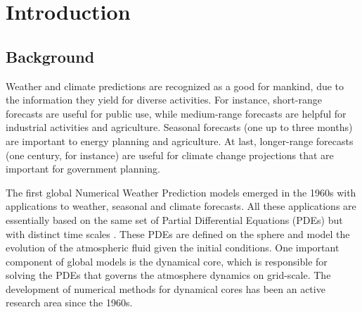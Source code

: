 

\chapter{Introduction}
\label{cap:introduction}

\enlargethispage{.5\baselineskip}

\section{Background}
Weather and climate predictions are recognized as a good for mankind,
due to the information they yield for diverse activities. 
For instance, short-range forecasts are useful for public use, while
medium-range forecasts are helpful for industrial activities and agriculture. 
Seasonal forecasts (one up to three months) are important to energy planning and agriculture.
At last, longer-range forecasts (one century, for instance) are useful for climate change 
projections that are important for government planning.

The first global Numerical Weather Prediction models emerged in the 1960s
with applications to weather, seasonal and climate forecasts. 
All these applications are essentially based on the same set of Partial Differential Equations
(PDEs) but with distinct time scales \citep{will:2007}. These PDEs are defined on the sphere
and model the evolution of the atmospheric fluid given the initial conditions.
One important component of global models is the dynamical core, which is responsible
for solving the PDEs that governs the atmosphere dynamics on grid-scale. 
The development of numerical methods for dynamical cores has been an active research area since the 1960s.

